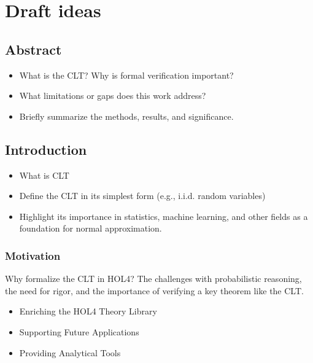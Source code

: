 \section*{Draft ideas}
\subsection{Abstract}
\begin{itemize}
    \item What is the CLT? Why is formal verification important?
    \item What limitations or gaps does this work address?
    \item Briefly summarize the methods, results, and significance.
\end{itemize}

\subsection{Introduction}
\cite{tian2022assumption}
\cite{qasim2016formalization}
\begin{itemize}
    \item What is CLT
    \item Define the CLT in its simplest form (e.g., i.i.d. random variables)
    \item Highlight its importance in statistics, machine learning, and other fields as a foundation for normal approximation.
\end{itemize}

\subsubsection{Motivation}
Why formalize the CLT in HOL4? 
The challenges with probabilistic reasoning, the need for rigor, and the importance of verifying a key theorem like the CLT.
\begin{itemize}
    \item Enriching the HOL4 Theory Library
    \item Supporting Future Applications
    \item Providing Analytical Tools
\end{itemize}


